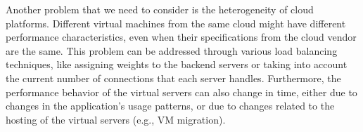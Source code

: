 

Another problem that we need to consider is the heterogeneity of cloud platforms.
Different virtual machines from the same cloud might have different performance
characteristics, even when their specifications from the cloud vendor are the same.
This problem can be addressed through various load balancing techniques, like
assigning weights to the backend servers or taking into account the current number
of connections that each server handles. Furthermore, the performance behavior
of the virtual servers can also change in time, either due to changes in
the application's usage patterns, or due to changes related to the hosting
of the virtual servers (e.g., VM migration).

